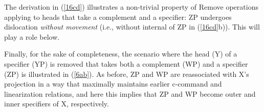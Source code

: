 \documentclass[output=paper]{langsci/langscibook}
\begin{document}
\noindent The derivation in (\ref{16cd}) illustrates a non-trivial property of
Remove operations applying to heads that take a complement and a specifier: ZP
undergoes  dislocation {\itshape without movement} (i.e., without internal  of
ZP in (\ref{16cd}b)). This will play a role below.

Finally, for the sake of completeness, the scenario where the head (Y) of a
specifier (YP) is removed that takes both a complement (WP) and a specifier
(ZP) is illustrated in (\ref{6ab}).  As before, ZP and WP are reassociated with
X's projection in a way that maximally maintains earlier c-command and
linearization relations, and here this implies that ZP and WP become outer and
inner specifiers of X, respectively.

%
%
%
%
\end{document}
